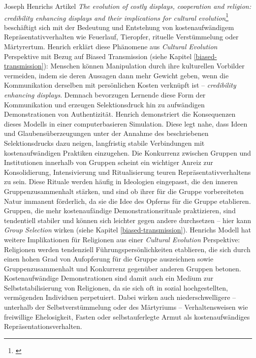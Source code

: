 \documentclass[openany,twoside,twocolumn]{book}
\let\rmarkdownfootnote\footnote%
\def\footnote{\protect\rmarkdownfootnote}
\begin{document}
Joseph Henrichs Artikel \emph{The evolution of costly displays,
cooperation and religion: credibility enhancing displays and their
implications for cultural evolution}\footnote{\textcite{henrich_evolution_2009}}
beschäftigt sich mit der Bedeutung und Entstehung von kostenaufwändigem
Repräsentativverhalten wie Feuerlauf, Tieropfer, rituelle Verstümmelung
oder Märtyrertum. Henrich erklärt diese Phänomene aus \emph{Cultural
Evolution} Perspektive mit Bezug auf Biased Transmission (siehe Kapitel
\ref{biased-transmission}): Menschen können Manipulation durch ihre
kulturellen Vorbilder vermeiden, indem sie deren Aussagen dann mehr
Gewicht geben, wenn die Kommunikation derselben mit persönlichen Kosten
verknüpft ist -- \emph{credibility enhancing displays}. Demnach
bevorzugen Lernende diese Form der Kommunikation und erzeugen
Selektionsdruck hin zu aufwändigen Demonstrationen von Authentizität.
Henrich demonstriert die Konsequenzen dieses Modells in einer
computerbasieren Simulation. Diese legt nahe, dass Ideen und
Glaubensüberzeugungen unter der Annahme des beschriebenen
Selektionsdrucks dazu neigen, langfristig stabile Verbindungen mit
kostenaufwändigen Praktiken einzugehen. Die Konkurrenz zwischen Gruppen
und Institutionen innerhalb von Gruppen scheint ein wichtiger Anreiz zur
Konsolidierung, Intensivierung und Ritualisierung teuren
Repräsentativverhaltens zu sein. Diese Rituale werden häufig in
Ideologien eingepasst, die den inneren Gruppenzusammenhalt stärken, und
sind ob ihrer für die Gruppe vorbereiteten Natur immanent förderlich, da
sie die Idee des Opferns für die Gruppe etablieren. Gruppen, die mehr
kostenaufändige Demonstrationsrituale praktizieren, sind tendentiell
stabiler und können sich leichter gegen andere durchsetzen -- hier kann
\emph{Group Selection} wirken (siehe Kapitel \ref{biased-transmission}).
Henrichs Modell hat weitere Implikationen für Religionen aus einer
\emph{Cultural Evolution} Perspektive: Religionen werden tendenziell
Führungspersönlichkeiten etablieren, die sich durch einen hohen Grad von
Aufopferung für die Gruppe auszeichnen sowie Gruppenzusammenhalt und
Konkurrenz gegenüber anderen Gruppen betonen. Kostenaufwändige
Demonstrationen sind damit auch ein Medium zur Selbststabilisierung von
Religionen, da sie sich oft in sozial hochgestellten, vermögenden
Individuen perpetuiert. Dabei wirken auch niederschwelligere --
unterhalb der Selbstverstümmelung oder des Märtyriums --
Verhaltensweisen wie freiwillige Ehelosigkeit, Fasten oder
selbstauferlegte Armut als kostenaufwändiges Repräsentationsverhalten.
\end{document}
